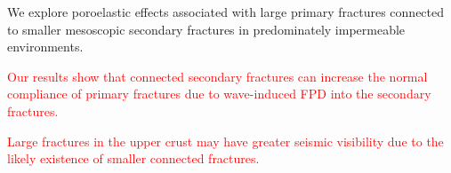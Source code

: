 \documentclass[draft]{agujournal2019}
\newcommand{\red}{\textcolor{red}}
\begin{document}





\begin{keypoints}
\item We explore poroelastic effects associated with large primary fractures connected to smaller mesoscopic secondary fractures  in predominately impermeable environments.
\item \red{Our results show that connected secondary fractures can increase the normal compliance of primary fractures due to wave-induced FPD into the secondary fractures.}
\item  \red{Large fractures in the upper crust may have greater seismic visibility due to the likely existence of smaller connected fractures.}
\end{keypoints}

%
%

%
%
\end{document}
